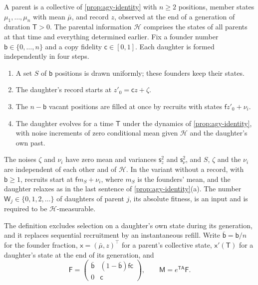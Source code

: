 \begin{definition}\label{def:evo-fission}
A parent is a collective of \cref{prop:agy-identity} with $n\ge2$ positions, member states $\mu_1,\dots,\mu_n$ with mean $\bar\mu$, and record $z$, observed at the end of a generation of duration $\mathsf T>0$. The parental information $\mathcal H$ comprises the states of all parents at that time and everything determined earlier. Fix a founder number $\mathsf b\in\{0,\dots,n\}$ and a copy fidelity $\mathsf c\in[0,1]$. Each daughter is formed independently in four steps.
\begin{enumerate}
\item[(i)] A set $S$ of $\mathsf b$ positions is drawn uniformly; these founders keep their states.
\item[(ii)] The daughter's record starts at $z'_0=\mathsf cz+\zeta$.
\item[(iii)] The $n-\mathsf b$ vacant positions are filled at once by recruits with states $\mathsf f z'_0+\nu_i$.
\item[(iv)] The daughter evolves for a time $\mathsf T$ under the dynamics of \cref{prop:agy-identity}, with noise increments of zero conditional mean given $\mathcal H$ and the daughter's own past.
\end{enumerate}
The noises $\zeta$ and $\nu_i$ have zero mean and variances $\mathsf s_z^2$ and $\mathsf s_\nu^2$, and $S$, $\zeta$ and the $\nu_i$ are independent of each other and of $\mathcal H$. In the variant without a record, with $\mathsf b\ge1$, recruits start at $\mathsf f m_S+\nu_i$, where $m_S$ is the founders' mean, and the daughter relaxes as in the last sentence of \cref{prop:agy-identity}(a). The number $\mathsf W_j\in\{0,1,2,\dots\}$ of daughters of parent $j$, its absolute fitness, is an input and is required to be $\mathcal H$-measurable.
\end{definition}

The definition excludes selection on a daughter's own state during its generation, and it replaces sequential recruitment by an instantaneous refill. Write $\bar{\mathsf b}=\mathsf b/n$ for the founder fraction, $\mathsf x=(\bar\mu,z)^\top$ for a parent's collective state, $\mathsf x'(\mathsf T)$ for a daughter's state at the end of its generation, and
\begin{equation}\label{eq:evo-fission-matrix}
\mathsf F=\begin{pmatrix}\bar{\mathsf b}&(1-\bar{\mathsf b})\mathsf f\mathsf c\\0&\mathsf c\end{pmatrix},\qquad\mathsf M=e^{\mathsf T\mathsf A}\mathsf F.
\end{equation}

